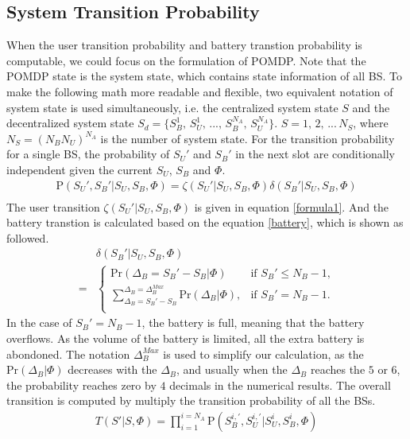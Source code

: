 \documentclass[conference]{IEEEtran}
\begin{document}
\subsection{System Transition Probability}
When the user transition probability and battery transtion probability is computable,
we could focus on the formulation of POMDP.
Note that the POMDP state is the system state, which contains state information of all BS. 
To make the following math more readable and flexible,
two equivalent notation of system state is used simultaneously, i.e. 
the centralized system state \(S\) and the decentralized system state \(S_d = \{S_B^1,\,S_U^1,\,...,\,S_B^{N_A},\,S_U^{N_A}\}\).
\(S = 1,\,2,\,...\,N_S\), where \(N_S = \left(N_BN_U\right)^{N_A}\) is the number of system state.
For the transition probability for a single BS, 
the probability of \(S_U'\) and \(S_B'\) in the next slot are conditionally independent 
given the current \(S_U\), \(S_B\) and \(\Phi\).
\begin{equation}
\begin{aligned}
	\mbox{P}\left(S_U',S_B'|S_U,S_B,\Phi\right) =
	\zeta\left(S_U'|S_U, S_B, \Phi\right) \delta\left(S_B'|S_U, S_B, \Phi\right)\\
\end{aligned}
\end{equation}
The user transition \(\zeta\left(S_U'|S_U, S_B, \Phi\right)\) is given in equation \eqref{formula1}.
And the battery transtion is calculated based on the equation \eqref{battery}, which is shown as followed.
\begin{align}
	&\delta\left(S_B'|S_U, S_B, \Phi\right)\nonumber\\
	= &
	\begin{cases} 
		\mbox{Pr}\left(\Delta_B = S_B' - S_B|\Phi \right) &\mbox{if $S_B' \le N_B - 1$,}\\
		\sum_{\Delta_B = S_B' - S_B}^{\Delta_B = \Delta_B^{Max}}\mbox{Pr}\left(\Delta_B|\Phi\right), 
		&\mbox{if $S_B' = N_B - 1$.}\\
\end{cases}
\end{align}
In the case of \(S_B'=N_B - 1\), the battery is full, meaning that the battery overflows. 
As the volume of the battery is limited, all the extra battery is abondoned.
The notation \(\Delta_B^{Max}\) is used to simplify our calculation, 
as the \(\mbox{Pr}\left(\Delta_B|\Phi\right)\) decreases with the \(\Delta_B\), 
and usually when the \(\Delta_B\) reaches the \(5\) or \(6\),
the probability reaches zero by \(4\) decimals in the numerical results.
The overall transition is computed by multiply the transition probability of all the BSs.
\begin{align}\label{transition}
	T\left(S'|S,\Phi\right) = \prod_{i = 1}^{i = N_A}\mbox{P}\left(S_B^{i,'}, S_U^{i,'}|S_U^i, S_B^i, \Phi\right)
\end{align}
\end{document}
